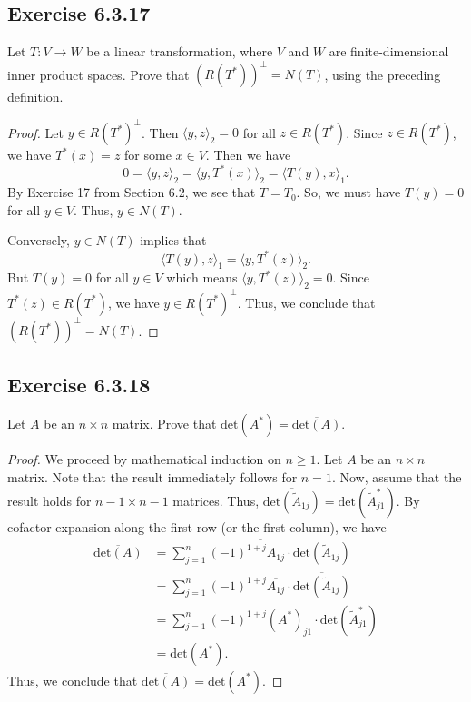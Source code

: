 \subsection*{Exercise 6.3.17} Let \( T: V \to W  \) be a linear transformation, where \( V  \) and \( W  \) are finite-dimensional inner product spaces. Prove that \( (R(T^{*}))^{\perp} = N(T) \), using the preceding definition.
\begin{proof}
Let \( y \in R(T^{*})^{\perp} \). Then \( \langle y , z  \rangle_2 = 0  \) for all \( z \in R(T^{*}) \). Since \( z \in R(T^{*}) \), we have \( T^{*}(x) = z  \) for some \( x \in V  \). Then we have
\[0 =   \langle y , z \rangle_2 = \langle y  , T^{*}(x) \rangle_2 = \langle T(y) , x  \rangle_1. \]
By Exercise 17 from Section 6.2, we see that \( T = {T}_{0} \). So, we must have \( T(y) = 0  \) for all \( y \in V  \). Thus, \( y \in N(T) \).

Conversely, \(  y \in N(T) \) implies that 
\[ \langle T(y)  , z  \rangle_1 = \langle y  ,  T^{*}(z) \rangle_2.  \]
But \( T(y) = 0  \) for all \( y \in V \) which means \( \langle y , T^{*}(z) \rangle_2 = 0  \). Since \( T^{*}(z) \in R(T^{*}) \), we have \( y \in R(T^{*})^{\perp} \). Thus, we conclude that \( (R(T^{*}))^{\perp} = N(T) \). 
\end{proof}

\subsection*{Exercise 6.3.18} Let \( A  \) be an \( n \times n  \) matrix. Prove that \( \text{det}(A^{*}) = \overline{\text{det}(A)} \).
\begin{proof}
    We proceed by mathematical induction on \( n \geq 1  \). Let \( A  \) be an \( n \times n  \) matrix. Note that the result immediately follows for \( n = 1  \). Now, assume that the result holds for \( n - 1 \times n - 1  \) matrices. Thus, \( \overline{\text{det}(\tilde{A}_{1j})} = \text{det}(\tilde{A}_{j1}^{*}) \). By cofactor expansion along the first row (or the first column), we have
\begin{align*}
    \overline{\text{det}(A)} &= \overline{\sum_{ j=1  }^{ n } (-1)^{1+j} {A}_{1j} \cdot \text{det}(\tilde{A}_{1j})  }  \\
                             &= \sum_{ j=1  }^{ n } (-1)^{1 + j} \overline{{A}_{1j}} \cdot \overline{\text{det}(\tilde{A}_{1j})} \\
                             &= \sum_{ j=1 }^{ n  } (-1)^{1+j} (A^{*})_{j1} \cdot \text{det}(\tilde{A}_{j1}^{*}) \\
                             &= \text{det}(A^{*}).
\end{align*}
Thus, we conclude that \( \overline{\text{det}(A)} = \text{det}(A^{*}) \). 
\end{proof}

